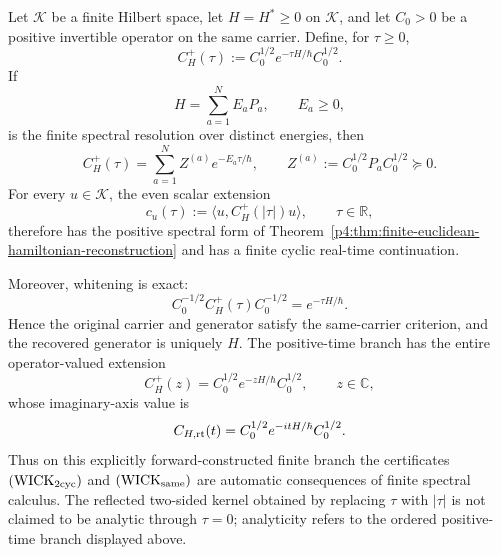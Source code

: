\documentclass[12pt,a4paper]{article}
\begin{document}
\begin{theorem}
\label{p4:thm:hamiltonian-generated-euclidean-branch}
Let \(\mathcal K\) be a finite Hilbert space, let
\(H=H^*\ge0\) on \(\mathcal K\), and let \(C_0>0\) be a positive invertible
operator on the same carrier.  Define, for \(\tau\ge0\),
\begin{equation}
\label{p4:eq:forward-hamiltonian-euclidean-kernel}
 C_H^+(\tau)
 :=C_0^{1/2}e^{-\tau H/\hbar}C_0^{1/2}.
\end{equation}
If
\[
 H=\sum_{a=1}^N E_aP_a,
 \qquad E_a\ge0,
\]
is the finite spectral resolution over distinct energies, then
\begin{equation}
\label{p4:eq:forward-hamiltonian-positive-spectral}
 C_H^+(\tau)
 =\sum_{a=1}^N Z^{(a)}e^{-E_a\tau/\hbar},
 \qquad
 Z^{(a)}:=C_0^{1/2}P_aC_0^{1/2}\succeq0.
\end{equation}
For every \(u\in\mathcal K\), the even scalar extension
\[
 c_u(\tau):=\langle u,C_H^+(|\tau|)u\rangle,
 \qquad \tau\in\mathbb R,
\]
therefore has the positive spectral form of
Theorem~\ref{p4:thm:finite-euclidean-hamiltonian-reconstruction} and has a
finite cyclic real-time continuation.

Moreover, whitening is exact:
\begin{equation}
\label{p4:eq:forward-hamiltonian-whitened-semigroup}
 C_0^{-1/2}C_H^+(\tau)C_0^{-1/2}
 =e^{-\tau H/\hbar}.
\end{equation}
Hence the original carrier and generator satisfy the same-carrier criterion,
and the recovered generator is uniquely \(H\).  The positive-time branch has
the entire operator-valued extension
\[
 C_H^+(z)=C_0^{1/2}e^{-zH/\hbar}C_0^{1/2},
 \qquad z\in\mathbb C,
\]
whose imaginary-axis value is
\[
 C_{H,\rm rt}(t)
 =C_0^{1/2}e^{-itH/\hbar}C_0^{1/2}.
\]
Thus on this explicitly forward-constructed finite branch the certificates
\((\mathrm{WICK}_{2{\rm cyc}})\) and \((\mathrm{WICK}_{\rm same})\) are
automatic consequences of finite spectral calculus.  The reflected two-sided
kernel obtained by replacing \(\tau\) with \(|\tau|\) is not claimed to be
analytic through \(\tau=0\); analyticity refers to the ordered positive-time
branch displayed above.
\end{theorem}
\end{document}
